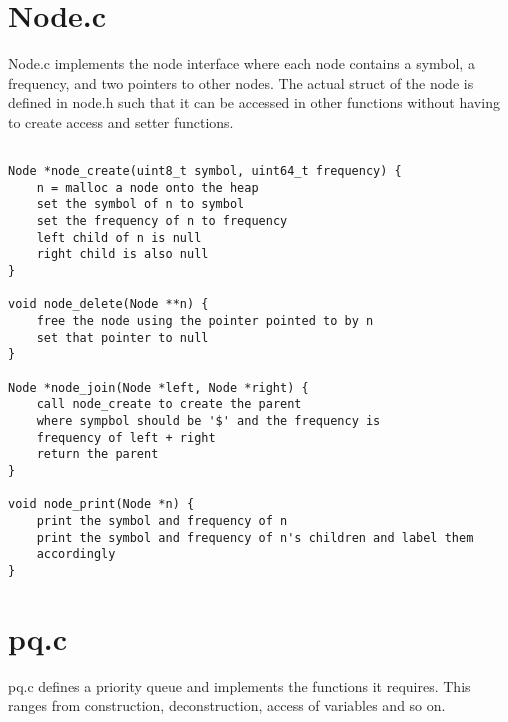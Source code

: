 \documentclass[11pt]{article}
\begin{document}
\section{Node.c}
Node.c implements the node interface where each node contains a symbol, a frequency, and two pointers to other nodes. The actual struct of the node is defined in node.h such that it can be accessed in other functions without having to create access and setter functions.

\begin{verbatim}

Node *node_create(uint8_t symbol, uint64_t frequency) {
    n = malloc a node onto the heap
    set the symbol of n to symbol
    set the frequency of n to frequency
    left child of n is null
    right child is also null
}

void node_delete(Node **n) {
    free the node using the pointer pointed to by n
    set that pointer to null
}

Node *node_join(Node *left, Node *right) {
    call node_create to create the parent
    where sympbol should be '$' and the frequency is
    frequency of left + right
    return the parent
}

void node_print(Node *n) {
    print the symbol and frequency of n
    print the symbol and frequency of n's children and label them
    accordingly
}
\end{verbatim}

\section{pq.c}
pq.c defines a priority queue and implements the functions it requires. This ranges from construction, deconstruction, access of variables and so on.
\end{document}
